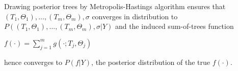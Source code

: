 

Drawing posterior trees by Metropolis-Hastings algorithm \cite{MH} ensures that $(T_1, \Theta_1), \ldots, (T_m, \Theta_m), \sigma$ converges in distribution to $P((T_1, \Theta_{1}), \ldots, (T_m, \Theta_m), \sigma|Y)$ and the induced sum-of-trees function 
\begin{center}
    $f(\cdot) = \sum_{j=1}^{m}g(\cdot; T_j, \Theta_j)$
\end{center}
hence converges to $P(f|Y)$, the posterior distribution of the true $f(\cdot)$.